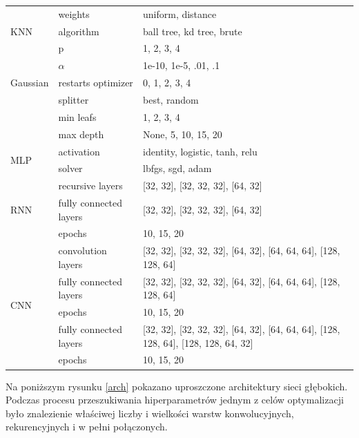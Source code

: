 \begin{table}[H]
    \centering
    \bigskip
    \begin{tabular}{|m{4cm}|m{4cm}|m{4cm}|}
    \hline
    \multirow{3}{*}{KNN} & weights & uniform, distance\\
    \cline{2-3}
     & algorithm & ball tree, kd tree, brute\\
    \cline{2-3}
        & p & 1, 2, 3, 4\\
    \hline
    \multirow{3}{*}{Gaussian} & $\alpha$ & 1e-10, 1e-5, .01, .1 \\
    \cline{2-3}
    & restarts optimizer & 0, 1, 2, 3, 4\\
    \hline
    \multirow{3}{*}{Drzewo decyzyjne} & splitter & best, random \\
    \cline{2-3}
     & min leafs & 1, 2, 3, 4\\
    \cline{2-3}
     & max depth & None, 5, 10, 15, 20\\
    \hline
    \multirow{2}{*}{MLP} & activation & identity, logistic, tanh, relu \\
    \cline{2-3}
     & solver & lbfgs, sgd, adam\\
    \hline
    \multirow{3}{*}{RNN} & recursive layers & [32, 32], [32, 32, 32], [64, 32] \\
    \cline{2-3}
     & fully connected layers & [32, 32], [32, 32, 32], [64, 32]\\
    \cline{2-3}
     & epochs & 10, 15, 20\\
    \hline
    \multirow{5}{*}{CNN} & convolution layers &                                   [32, 32],
    [32, 32, 32],
    [64, 32],
    [64, 64, 64],
    [128, 128, 64] \\
    \cline{2-3}
     & fully connected layers & 
     [32, 32],
     [32, 32, 32],
     [64, 32],
     [64, 64, 64],
     [128, 128, 64]\\
    \cline{2-3}
     & epochs & 10, 15, 20\\
    \hline
    \multirow{2}{*}{NN} & fully connected layers &                                   [32, 32],
    [32, 32, 32],
    [64, 32],
    [64, 64, 64],
    [128, 128, 64],
    [128, 128, 64, 32]\\
    \cline{2-3}
     & epochs & 10, 15, 20 \\
    \hline

    \end{tabular}
\end{table}

Na poniższym rysunku \ref{arch} pokazano uproszczone architektury sieci głębokich.
Podczas procesu przeszukiwania hiperparametrów jednym z celów optymalizacji 
było znalezienie właściwej liczby i wielkości warstw konwolucyjnych, rekurencyjnych
i w pełni połączonych.

